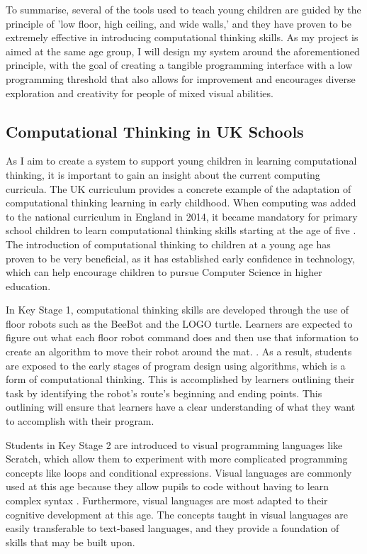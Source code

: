 \documentclass[oneside,%
                    author={Malak Hajji},
                    degree={BSc},
                    title={Designing An Accessible Ozobot Programming Platform for Students},
                  subtitle={With Mixed Visual Abilities}]{dissertation}
\begin{document}
To summarise, several of the tools used to teach young children are guided by the principle of 'low floor, high ceiling, and wide walls,' and they have proven to be extremely effective in introducing computational thinking skills. As my project is aimed at the same age group, I will design my system around the aforementioned principle, with the goal of creating a tangible programming interface with a low programming threshold that also allows for improvement and encourages diverse exploration and creativity for people of mixed visual abilities.

\subsection{Computational Thinking in UK Schools}
As I aim to create a system to support young children in learning computational thinking, it is important to gain an insight about the current computing curricula.
The UK curriculum provides a concrete example of the adaptation of computational thinking learning in early childhood. When computing was added to the national curriculum in England in 2014, it became mandatory for primary school children to learn computational thinking skills starting at the age of five \cite{education-department}.
The introduction of computational thinking to children at a young age has proven to be very beneficial, as it has established early confidence in technology, which can help encourage children to pursue Computer Science in higher education\cite{confidence}.

In Key Stage 1, computational thinking skills are developed through the use of floor robots such as the BeeBot and the LOGO turtle. Learners are expected to figure out what each floor robot command does and then use that information to create an algorithm to move their robot around the mat. \cite{robot-KS1,education-department,curricula}. As a result, students are exposed to the early stages of program design using algorithms, which is a form of computational thinking. This is accomplished by learners outlining their task by identifying the robot's route's beginning and ending points. This outlining will ensure that learners have a clear understanding of what they want to accomplish with their program\cite{curricula}.

Students in Key Stage 2 are introduced to visual programming languages like Scratch\cite{scratch}, which allow them to experiment with more complicated programming concepts like loops and conditional expressions. Visual languages are commonly used at this age because they allow pupils to code without having to learn complex syntax \cite{curricula}. Furthermore, visual languages are most adapted to their cognitive development at this age\cite{cognitive}. The concepts taught in visual languages are easily transferable to text-based languages, and they provide a foundation of skills that may be built upon.
\end{document}
